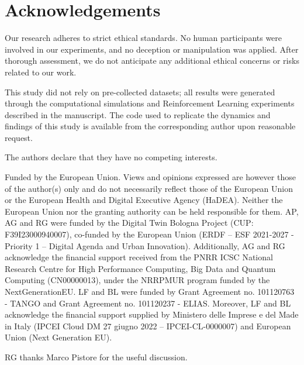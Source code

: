 \documentclass[pdflatex,sn-mathphys-num]{sn-jnl}%
\theoremstyle{thmstyleone}%
\theoremstyle{thmstyletwo}%
\theoremstyle{thmstylethree}%
\begin{document}
\clearpage
\section*{Acknowledgements}
Our research adheres to strict ethical standards. No human participants were involved in our experiments, and no deception or manipulation was applied. After thorough assessment, we do not anticipate any additional ethical concerns or risks related to our work.

This study did not rely on pre-collected datasets; all results were generated through the computational simulations and Reinforcement Learning experiments described in the manuscript. The code used to replicate the dynamics and findings of this study is available from the corresponding author upon reasonable request.

The authors declare that they have no competing interests.

Funded by the European Union. Views and opinions expressed are however those of the author(s) only and do not necessarily reflect those of the European Union or the European Health and Digital Executive Agency (HaDEA). Neither the European Union nor the granting authority can be held responsible for them. AP, AG and RG were funded by the Digital Twin Bologna Project (CUP: F39I23000940007), co-funded by the European Union (ERDF – ESF 2021-2027 - Priority 1 – Digital Agenda and Urban Innovation). Additionally, AG and RG acknowledge the financial support received from the PNRR ICSC National Research Centre for High Performance Computing, Big Data and Quantum Computing (CN00000013), under the NRRPMUR program funded by the NextGenerationEU. LF and BL were funded by Grant Agreement no. 101120763 - TANGO and Grant Agreement no. 101120237 - ELIAS. Moreover, LF and BL acknowledge the financial support supplied by Ministero delle Imprese e del Made in Italy (IPCEI Cloud DM 27 giugno 2022 – IPCEI-CL-0000007) and European Union (Next Generation EU).

RG thanks Marco Pistore for the useful discussion.


\newpage
\clearpage


\end{document}
